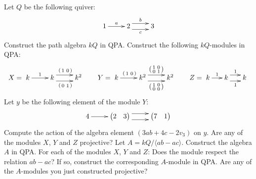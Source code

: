 \documentclass[a4paper]{amsart}
\newcommand{\VV}[2]{\begin{pmatrix} #1 & #2 \end{pmatrix}}
\newcommand{\vv}[2]{\left( \begin{smallmatrix} #1 & #2 \end{smallmatrix} \right)}
\begin{document}
\begin{Exercise}[title={Modules}]
Let $Q$ be the following quiver:
\[
\xymatrix{
1 \ar[r]^a &
2 \ar@<1ex>[r]^b \ar@<-1ex>[r]_c &
3
}
\]
\Question Construct the path algebra $kQ$ in QPA.
\Question Construct the following $kQ$-modules in QPA:
\[
X =
\xymatrix{
k \ar[r]^1 &
k \ar@<1ex>[r]^{\vv{1}{0}}
  \ar@<-1ex>[r]_{\vv{0}{1}} &
k^2
}
\qquad
Y =
\xymatrix{
k \ar[r]^{\vv{1}{0}} &
k^2 \ar@<1ex>[r]^{\left(\begin{smallmatrix} 1&0 \\ 0&1 \end{smallmatrix}\right)}
    \ar@<-1ex>[r]_{\left(\begin{smallmatrix} 1&0 \\ 0&0 \end{smallmatrix}\right)} &
k^2
}
\qquad
Z =
\xymatrix@C=1.5em{
k \ar[r]^1 &
k \ar@<1ex>[r]^{1}
  \ar@<-1ex>[r]_{1} &
k
}
\]
\Question Let $y$ be the following element of the module $Y$:
\[
\xymatrix{
4 \ar[r] &
{\VV{2}{3}} \ar@<1ex>[r] \ar@<-1ex>[r] &
{\VV{7}{1}}
}
\]
Compute the action of the algebra element $(3ab + 4c - 2v_3)$ on $y$.
\Question Are any of the modules $X$, $Y$ and $Z$ projective?
\Question Let $A = kQ/\langle ab - ac \rangle$.  Construct the algebra
$A$ in QPA.
\Question For each of the modules $X$, $Y$ and $Z$: Does the module
respect the relation $ab - ac$?  If so, construct the corresponding
$A$-module in QPA.
\Question Are any of the $A$-modules you just constructed projective?
\end{Exercise}






\end{document}
